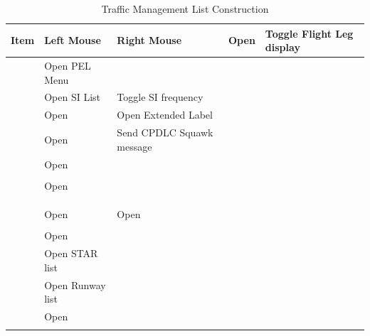 \documentclass[a4paper,oneside,11pt]{memoir}
\begin{document}
\begin{longtable}{|p{}|p{}|p{}|}    \hline
  \textbf{Item}         & \textbf{Left Mouse}     & \textbf{Right Mouse}      \endhead \hline
       & Open   & Toggle Flight Leg display \\ \hline
        & Open PEL Menu           &                           \\ \hline
         & Open SI List            & Toggle SI frequency       \\ \hline
   & Open    & Open Extended Label       \\ \hline
       & Open  & Send CPDLC Squawk message \\ \hline
        & Open   &                           \\ \hline
          &                         &                           \\ \hline
        & Open   &                           \\ \hline
       &                         &                           \\ \hline
        &                         &                           \\ \hline
        &                         &                           \\ \hline
        & Open   & Open    \\ \hline
  \footnotemark[1]    &                         &           \\ \hline
        & Open    &                           \\ \hline
       & Open STAR list          &                           \\ \hline
       & Open Runway list        &                           \\ \hline
         & Open   &                          \\ \hline
  \caption{Traffic Management List Construction}
\end{longtable}

\end{document}
